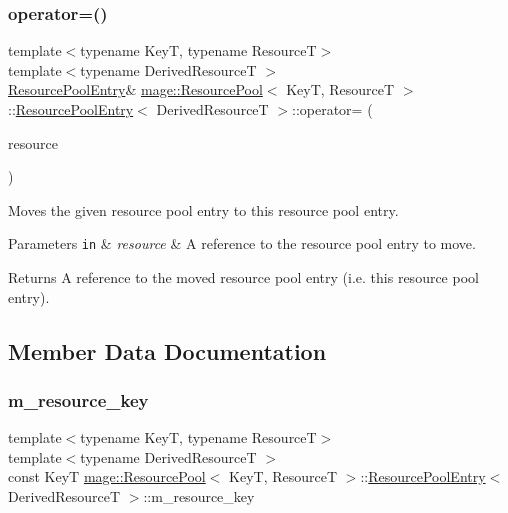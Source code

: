 \subsubsection{\texorpdfstring{operator=()}{operator=()}\hspace{0.1cm}{\footnotesize\ttfamily [2/2]}}
{\footnotesize\ttfamily template$<$typename KeyT, typename ResourceT$>$ \\
template$<$typename Derived\+ResourceT $>$ \\
\hyperlink{structmage_1_1_resource_pool_1_1_resource_pool_entry}{Resource\+Pool\+Entry}\& \hyperlink{classmage_1_1_resource_pool}{mage\+::\+Resource\+Pool}$<$ KeyT, ResourceT $>$\+::\hyperlink{structmage_1_1_resource_pool_1_1_resource_pool_entry}{Resource\+Pool\+Entry}$<$ Derived\+ResourceT $>$\+::operator= (\begin{DoxyParamCaption}\item[{\hyperlink{structmage_1_1_resource_pool_1_1_resource_pool_entry}{Resource\+Pool\+Entry}$<$ Derived\+ResourceT $>$ \&\&}]{resource }\end{DoxyParamCaption})\hspace{0.3cm}{\ttfamily [delete]}}

Moves the given resource pool entry to this resource pool entry.


\begin{DoxyParams}[1]{Parameters}
\mbox{\tt in}  & {\em resource} & A reference to the resource pool entry to move. \\
\hline
\end{DoxyParams}
\begin{DoxyReturn}{Returns}
A reference to the moved resource pool entry (i.\+e. this resource pool entry). 
\end{DoxyReturn}


\subsection{Member Data Documentation}
\hypertarget{structmage_1_1_resource_pool_1_1_resource_pool_entry_a6cfd8e2ed45a7655aff852e494054865}{}\label{structmage_1_1_resource_pool_1_1_resource_pool_entry_a6cfd8e2ed45a7655aff852e494054865} 
\subsubsection{\texorpdfstring{m\+\_\+resource\+\_\+key}{m\_resource\_key}}
{\footnotesize\ttfamily template$<$typename KeyT, typename ResourceT$>$ \\
template$<$typename Derived\+ResourceT $>$ \\
const KeyT \hyperlink{classmage_1_1_resource_pool}{mage\+::\+Resource\+Pool}$<$ KeyT, ResourceT $>$\+::\hyperlink{structmage_1_1_resource_pool_1_1_resource_pool_entry}{Resource\+Pool\+Entry}$<$ Derived\+ResourceT $>$\+::m\+\_\+resource\+\_\+key\hspace{0.3cm}{\ttfamily [private]}}

